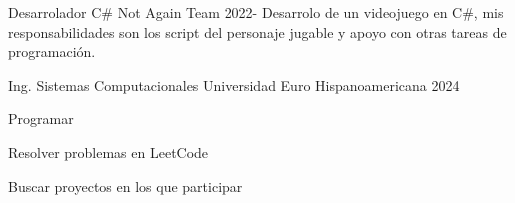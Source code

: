\documentclass[11pt]{spidercv}
\begin{document}
    \begin{MainPart}

    \Experience
        {\ColorHighlight}
		{Desarrolador C\#}
		{Not Again Team}
        {2022-\faUndo}
        {
	        Desarrolo de un videojuego en C\#, mis responsabilidades son		    los script del personaje jugable y apoyo con otras tareas de                programación.   
        }

    
    \Experience
        {\ColorHighlight}
		{Ing. Sistemas Computacionales}
		{Universidad Euro Hispanoamericana}
        {2024}
        {   
 		
        }

    \vspace*{0.5cm}
    \begin{DoubleColumns}
        \begin{ItemList}{\ColorHighlight}
            \item [] Programar
            \item [] Resolver problemas en LeetCode
        \end{ItemList}
        \nextcolumn
        \begin{ItemList}{\ColorHighlight}
            \item [] Buscar proyectos en los que participar
        \end{ItemList}
    \end{DoubleColumns}

    \end{MainPart}

    
\end{document}
